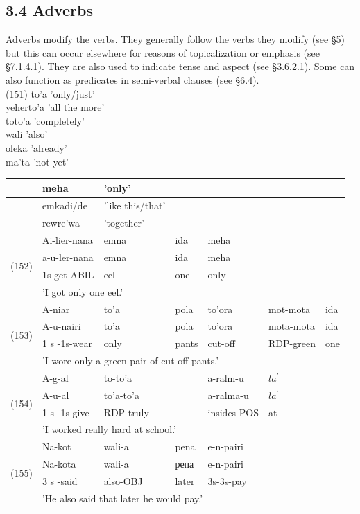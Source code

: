 \documentclass[10pt]{article}
\begin{document}
\subsection*{3.4 Adverbs}
Adverbs modify the verbs. They generally follow the verbs they modify (see §5) but this can occur elsewhere for reasons of topicalization or emphasis (see §7.1.4.1). They are also used to indicate tense and aspect (see §3.6.2.1). Some can also function as predicates in semi-verbal clauses (see §6.4).\\
(151) to'a 'only/just'\\
yeherto'a 'all the more'\\
toto'a 'completely'\\
wali 'also'\\
oleka 'already'\\
ma'ta 'not yet'

\begin{center}
\begin{tabular}{|l|l|l|l|l|l|l|}
\hline
\multirow{3}{*}{} & meha & 'only' & \multicolumn{4}{|c|}{} \\
\hline
 & emkadi/de & 'like this/that' &  &  &  &  \\
\hline
 & rewre'wa & 'together' &  &  &  &  \\
\hline
\multirow[t]{4}{*}{(152)} & Ai-lier-nana & emna & ida & meha &  &  \\
\hline
 & a-u-ler-nana & emna & ida & meha &  &  \\
\hline
 & 1s-get-ABIL & eel & one & only &  &  \\
\hline
 & \multicolumn{5}{|l|}{'I got only one eel.'} &  \\
\hline
\multirow[t]{4}{*}{(153)} & A-niar & to'a & pola & to'ora & mot-mota & ida \\
\hline
 & A-u-nairi & to'a & pola & to'ora & mota-mota & ida \\
\hline
 & 1 s -1s-wear & only & pants & cut-off & RDP-green & one \\
\hline
 & \multicolumn{6}{|l|}{'I wore only a green pair of cut-off pants.'} \\
\hline
\multirow[t]{4}{*}{(154)} & A-g-al & to-to'a &  & a-ralm-u & \(l a^{\prime}\) &  \\
\hline
 & A-u-al & to'a-to'a &  & a-ralma-u & \(l a^{\prime}\) &  \\
\hline
 & 1 s -1s-give & RDP-truly &  & insides-POS & at &  \\
\hline
 & \multicolumn{6}{|l|}{'I worked really hard at school.'} \\
\hline
\multirow[t]{4}{*}{(155)} & Na-kot & wali-a & pena & e-n-pairi &  &  \\
\hline
 & Na-kota & wali-a & репа & e-n-pairi &  &  \\
\hline
 & 3 s -said & also-OBJ & later & 3s-3s-pay &  &  \\
\hline
 & \multicolumn{6}{|l|}{'He also said that later he would pay.'} \\
\hline
\end{tabular}
\end{center}
\end{document}
